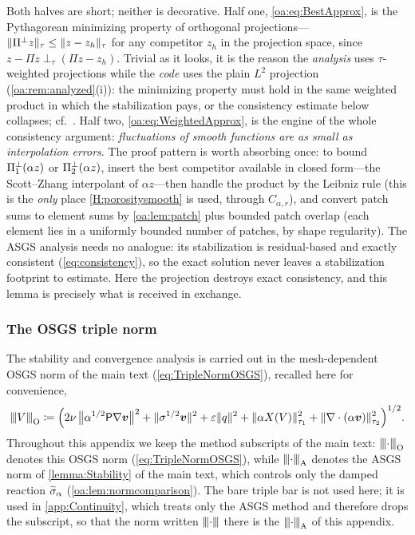 \begin{pedagogy}
Both halves are short; neither is decorative. Half one, \cref{oa:eq:BestApprox},
is the Pythagorean minimizing property of orthogonal projections---
$\lVert \Pi^\perp z \rVert_{\tau} \le \lVert z - z_h \rVert_{\tau}$ for any competitor $z_h$
in the projection space, since $z - \Pi z \perp_\tau (\Pi z - z_h)$. Trivial as
it looks, it is the reason the \emph{analysis} uses $\tau$-weighted projections
while the \emph{code} uses the plain $L^2$ projection
(\cref{oa:rem:analyzed}(i)): the minimizing property must hold in the same
weighted product in which the stabilization pays, or the consistency estimate
below collapses; cf.~\cite[Remark~4]{codina2008analysis}. Half two,
\cref{oa:eq:WeightedApprox}, is the engine of the whole consistency argument:
\emph{fluctuations of smooth functions are as small as interpolation errors}.
The proof pattern is worth absorbing once: to bound $\Pi_{1}^{\perp}(\alpha z)$ or
$\Pi_{2}^{\perp}(\alpha z)$, insert the best competitor available in closed form---the
Scott--Zhang interpolant of $\alpha z$---then handle the product by the Leibniz
rule (this is the \emph{only} place \cref{H:porositysmooth} is used, through
$C_{\alpha,r}$), and convert patch sums to element sums by \cref{oa:lem:patch}
plus bounded patch overlap (each element lies in a uniformly bounded number of
patches, by shape regularity). The ASGS analysis needs no analogue: its
stabilization is residual-based and exactly consistent (\cref{eq:consistency}),
so the exact solution never leaves a stabilization footprint to estimate. Here
the projection destroys exact consistency, and this lemma is precisely what is
received in exchange.
\end{pedagogy}

\subsubsection{The OSGS triple norm}
\label{oa:sec:norm}

The stability and convergence analysis is carried out in the mesh-dependent OSGS norm of the
main text (\cref{eq:TripleNormOSGS}), recalled here for convenience,
\begin{equation}
  \label{oa:eq:TripleNorm}
  {\lvert\kern-0.25ex\lvert\kern-0.25ex\lvert V \rvert\kern-0.25ex\rvert\kern-0.25ex\rvert}_{\mathrm O}
  \coloneqq
  \Bigl(
  2\nu\,\bigl\lVert \alpha^{1/2}\mathsf{P}\nabla\boldsymbol{v} \bigr\rVert^2
  + \lVert \sigma^{1/2}\boldsymbol{v} \rVert^2
  + \varepsilon\lVert q \rVert^2
  + \lVert \alpha X(V) \rVert_{\tau_1}^2
  + \lVert \nabla\cdot(\alpha\boldsymbol{v}) \rVert_{\tau_2}^2
  \Bigr)^{1/2}.
\end{equation}
Throughout this appendix we keep the method subscripts of the main text:
${\lvert\kern-0.25ex\lvert\kern-0.25ex\lvert \cdot \rvert\kern-0.25ex\rvert\kern-0.25ex\rvert}_{\mathrm O}$ denotes this OSGS norm (\cref{eq:TripleNormOSGS}), while
${\lvert\kern-0.25ex\lvert\kern-0.25ex\lvert \cdot \rvert\kern-0.25ex\rvert\kern-0.25ex\rvert}_{\mathrm A}$ denotes the ASGS norm of \cref{lemma:Stability} of the main text,
which controls only the damped reaction $\widetilde{\sigma}_{\alpha}$ (\cref{oa:lem:normcomparison}). The bare
triple bar is not used here; it is used in \cref{app:Continuity}, which treats only the ASGS
method and therefore drops the subscript, so that the norm written ${\lvert\kern-0.25ex\lvert\kern-0.25ex\lvert \cdot \rvert\kern-0.25ex\rvert\kern-0.25ex\rvert}$ there is the
${\lvert\kern-0.25ex\lvert\kern-0.25ex\lvert \cdot \rvert\kern-0.25ex\rvert\kern-0.25ex\rvert}_{\mathrm A}$ of this appendix.

